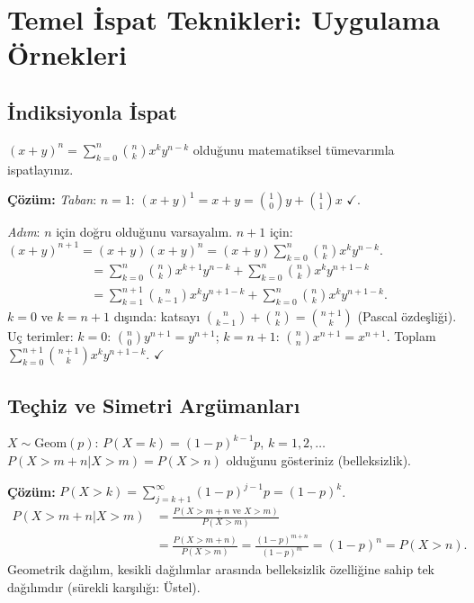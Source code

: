 \section{Temel İspat Teknikleri: Uygulama Örnekleri}
\label{app:ispat_ornekler}

\subsection{İndiksiyonla İspat}

\begin{ornek}
$(x+y)^n = \sum_{k=0}^n \binom{n}{k}x^k y^{n-k}$ olduğunu matematiksel tümevarımla ispatlayınız.

\textbf{Çözüm:}
\emph{Taban}: $n=1$: $(x+y)^1=x+y=\binom{1}{0}y+\binom{1}{1}x$ $\checkmark$.

\emph{Adım}: $n$ için doğru olduğunu varsayalım. $n+1$ için:
$(x+y)^{n+1}=(x+y)(x+y)^n=(x+y)\sum_{k=0}^n\binom{n}{k}x^k y^{n-k}$.
\begin{align*}
&= \sum_{k=0}^n\binom{n}{k}x^{k+1}y^{n-k}+\sum_{k=0}^n\binom{n}{k}x^k y^{n+1-k}\\
&= \sum_{k=1}^{n+1}\binom{n}{k-1}x^k y^{n+1-k}+\sum_{k=0}^n\binom{n}{k}x^k y^{n+1-k}.
\end{align*}
$k=0$ ve $k=n+1$ dışında: katsayı $\binom{n}{k-1}+\binom{n}{k}=\binom{n+1}{k}$ (Pascal özdeşliği). Uç terimler: $k=0$: $\binom{n}{0}y^{n+1}=y^{n+1}$; $k=n+1$: $\binom{n}{n}x^{n+1}=x^{n+1}$. Toplam $\sum_{k=0}^{n+1}\binom{n+1}{k}x^k y^{n+1-k}$. $\checkmark$
\end{ornek}

\subsection{Teçhiz ve Simetri Argümanları}

\begin{ornek}
$X\sim\mathrm{Geom}(p)$: $P(X=k)=(1-p)^{k-1}p$, $k=1,2,\ldots$
$P(X>m+n|X>m)=P(X>n)$ olduğunu gösteriniz (belleksizlik).

\textbf{Çözüm:}
$P(X>k)=\sum_{j=k+1}^\infty(1-p)^{j-1}p=(1-p)^k$.
\begin{align*}
P(X>m+n|X>m) &= \frac{P(X>m+n\text{ ve }X>m)}{P(X>m)}\\
&= \frac{P(X>m+n)}{P(X>m)} = \frac{(1-p)^{m+n}}{(1-p)^m} = (1-p)^n = P(X>n).
\end{align*}
Geometrik dağılım, kesikli dağılımlar arasında belleksizlik özelliğine sahip tek dağılımdır (sürekli karşılığı: Üstel).
\end{ornek}

